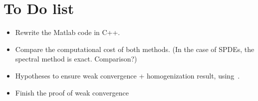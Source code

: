 \section*{To Do list}
\begin{itemize}
    \item Rewrite the Matlab code in C++.
    \item Compare the computational cost of both methods. (In the case of SPDEs, the spectral method is exact. Comparison?)
    \item Hypotheses to ensure weak convergence + homogenization result, using~\cite{pardoux2001poisson}.
    \item Finish the proof of weak convergence
\end{itemize}

